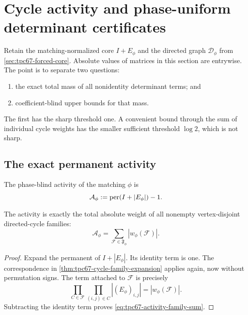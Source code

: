 \section{Cycle activity and phase-uniform determinant certificates}
\label{sec:tpc67-cycle-activity}

Retain the matching-normalized core \(I+E_\phi\) and the directed graph
\(\mathcal D_\phi\) from \cref{sec:tpc67-forced-core}.  Absolute values of
matrices in this section are entrywise.  The point is to separate two
questions:
\begin{enumerate}[label=(\roman*)]
\item the exact total mass of all nonidentity determinant terms; and
\item coefficient-blind upper bounds for that mass.
\end{enumerate}
The first has the sharp threshold one.  A convenient bound through the sum
of individual cycle weights has the smaller sufficient threshold
\(\log 2\), which is not sharp.

\subsection{The exact permanent activity}

\begin{definition}
\label{def:tpc67-matching-activity}
The phase-blind activity of the matching \(\phi\) is
\begin{equation}
 \mathcal A_\phi
 :=
 \operatorname{per}(I+|E_\phi|)-1.
 \label{eq:tpc67-activity-permanent}
\end{equation}
\end{definition}

\begin{proposition}
\label{prop:tpc67-exact-activity}
The activity is exactly the total absolute weight of all nonempty
vertex-disjoint directed-cycle families:
\begin{equation}
 \boxed{
 \mathcal A_\phi
 =
 \sum_{\mathcal F\in\mathfrak F_\phi}
 |w_\phi(\mathcal F)|.}
 \label{eq:tpc67-activity-family-sum}
\end{equation}
\end{proposition}

\begin{proof}
Expand the permanent of \(I+|E_\phi|\).  Its identity term is one.
The correspondence in \cref{thm:tpc67-cycle-family-expansion} applies
again, now without permutation signs.  The term attached to
\(\mathcal F\) is precisely
\[
 \prod_{C\in\mathcal F}\prod_{(i,j)\in C}|(E_\phi)_{i,j}|
 =
 |w_\phi(\mathcal F)|.
\]
Subtracting the identity term proves
\eqref{eq:tpc67-activity-family-sum}.
\end{proof}

